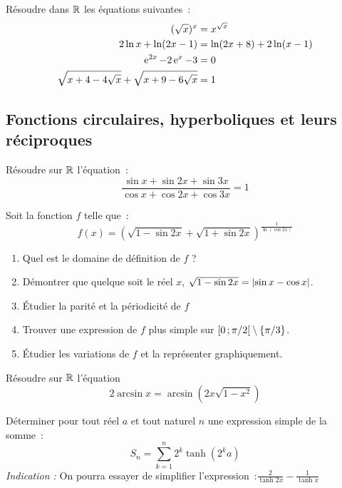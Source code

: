 \begin{exercice}
    Résoudre dans \(\mathbb{R}\) les équations suivantes~:
    \begin{align}
        (\sqrt{x})^x &= x^{\sqrt{x}} \\
        2\ln x + \ln(2x-1) &= \ln(2x+8) + 2\ln(x-1) \\
        \operatorname{e}^{2x} -2\operatorname{e}^x-3 &=0 \\
        \sqrt{x+4-4\sqrt{x}} + \sqrt{x+9-6\sqrt{x}} &= 1
    \end{align}
\end{exercice}
\subsection{Fonctions circulaires, hyperboliques et leurs réciproques}
\begin{exercice}
    Résoudre sur \(\mathbb{R}\) l'équation~:
    \begin{equation}
        \frac{\sin x + \sin 2x + \sin 3x}{\cos x + \cos 2x + \cos 3x} = 1
    \end{equation}
\end{exercice}
\begin{exercice}
    Soit la fonction \(f\) telle que~:
    \begin{equation}
        f(x) = (\sqrt{1-\sin 2x}+\sqrt{1+\sin 2x})^{\frac{1}{\ln(\cos 2x)}}
    \end{equation}
    \begin{enumerate}
        \item Quel est le domaine de définition de \(f\) ?
        \item Démontrer que quelque soit le réel \(x\), \(\sqrt{1-\sin 2x}=\left\lvert\sin x - \cos x\right\rvert\).
        \item Étudier la parité et la périodicité de \(f\)
        \item Trouver une expression de \(f\) plus simple sur \(\left[ 0 \, ;  \pi/2 \right[\setminus\{\pi/3\}\).
        \item Étudier les variations de \(f\) et la représenter graphiquement.
    \end{enumerate}
\end{exercice}
\begin{exercice}
    Résoudre sur \(\mathbb{R}\) l'équation
    \begin{equation}
        2\arcsin x = \arcsin(2x\sqrt{1-x^2})
    \end{equation}
\end{exercice}
\begin{exercice}
    Déterminer pour tout réel \(a\) et tout naturel \(n\) une expression simple de la somme~:
    \begin{equation}
        S_n = \sum_{k=1}^n 2^k \tanh(2^k a)
    \end{equation}
    \emph{Indication :} On pourra essayer de simplifier l'expression~:\(\frac{2}{\tanh 2x} - \frac{1}{\tanh x}\)
\end{exercice}
